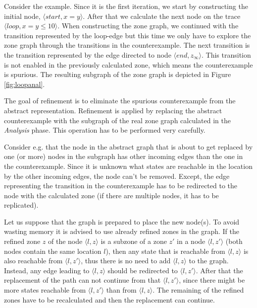 \begin{example}
	Consider the example. Since it is the first iteration, we start by constructing the initial node, $\langle start, x=y \rangle$. After that we calculate the next node on the trace $\langle loop, x=y \leq 10 \rangle$. When constructing the zone graph, we continued with the transition represented by the loop-edge but this time we only have to explore the zone graph through the transitions in the counterexample. The next transition is the transition represented by the edge directed to node $\langle end, z_\infty \rangle$. This transition is not enabled in the previously calculated zone, which means the counterexample is spurious. The resulting subgraph of the zone graph is depicted in Figure \ref{fig:loopanal}.
\end{example}

The goal of refinement is to eliminate the spurious counterexample from the abstract representation. Refinement is applied by replacing the abstract counterexample with the subgraph of the real zone graph calculated in the \emph{Analysis} phase. This operation has to be performed very carefully.

Consider e.g. that the node in the abstract graph that is about to get replaced by one (or more) nodes in the subgraph has other incoming edges than the one in the counterexample. Since it is unknown what states are reachable in the location by the other incoming edges, the node can't be removed. Except, the edge representing the transition in the counterexample has to be redirected to the node with the calculated zone (if there are multiple nodes, it has to be replicated).

Let us suppose that the graph is prepared to place the new node(s). To avoid wasting memory it is advised to use already refined zones in the graph. If the refined zone $z$ of the node $\langle l,z \rangle$ is a subzone of a zone $z'$ in a node $\langle l,z' \rangle$ (both nodes
contain the same location $l$), then any state that is reachable from $\langle l,z \rangle$ is also reachable from $\langle l,z' \rangle$, thus there is no need to add  $\langle l,z \rangle$ to the graph. Instead, any edge leading to  $\langle l,z \rangle$ should be redirected to $\langle l,z' \rangle$. After that the replacement of the path can not continue from that $\langle l,z' \rangle$, since there might be more states reachable from $\langle l,z' \rangle$ than from $\langle l,z \rangle$. The remaining of the refined zones have to be recalculated and then the replacement can continue.

